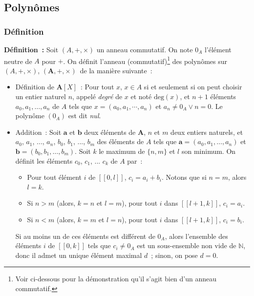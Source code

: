 \subsection{Polynômes}

\subsubsection{Définition} 

\noindent\textbf{Définition :} Soit $(A, +, \times)$ un anneau commutatif. 
    On note $0_A$ l'élément neutre de $A$ pour $+$.
    On définit l'anneau (commutatif)\footnote{Voir ci-dessous pour la démonstration qu'il s'agit bien d'un anneau commutatif.} des polynômes sur $(A, +, \times)$, $(\mathbf{A}, +, \times)$ de la manière suivante : 
    \begin{itemize}[nosep]
        \item Définition de $\mathbf{A}[X]$ : Pour tout $x$, $x \in A$ si et seulement si on peut choisir un entier naturel $n$, appelé \textit{degré} de $x$ et noté $\mathrm{deg}(x)$, et $n+1$ éléments $a_0, a_1, \dots, a_n$ de $A$ tels que $x = (a_0, a_1, \cdots, a_n)$ et $a_n \neq 0_A \vee n = 0$.
            Le polynôme $(0_A)$ est dit \textit{nul}.
        \item Addition : Soit $\mathbf{a}$ et $\mathbf{b}$ deux éléments de $\mathbf{A}$, $n$ et $m$ deux entiers naturels, et $a_0$, $a_1$, ..., $a_n$, $b_0$, $b_1$, ..., $b_m$ des éléments de $A$ tels que $\mathbf{a} = (a_0, a_1, \dots, a_n)$ et $\mathbf{b} = (b_0, b_1, \dots, b_m)$.
            Soit $k$ le maximum de $\lbrace n, m \rbrace$ et $l$ son minimum.
            On définit les éléments $c_0$, $c_1$, ... $c_k$ de $A$ par : 
            \begin{itemize}[nosep]
                \item Pour tout élément $i$ de $[\![0, l]\!]$, $c_i = a_i + b_i$.
                    Notons que si $n = m$, alors $l = k$.
                \item Si $n > m$ (alors, $k = n$ et $l = m$), pour tout $i$ dans $[\![l+1, k]\!]$, $c_i = a_i$.
                \item Si $n < m$ (alors, $k = m$ et $l = n$), pour tout $i$ dans $[\![l+1, k]\!]$, $c_i = b_i$.
            \end{itemize}
            Si au moins un de ces éléments est différent de $0_A$, alors l'ensemble des éléments $i$ de $[\![0, k]\!]$ tels que $c_i \neq 0_A$ est un sous-ensemble non vide de $\mathbb{N}$, donc il admet un unique élément maximal $d$ ; sinon, on pose $d = 0$.

\end{itemize}
